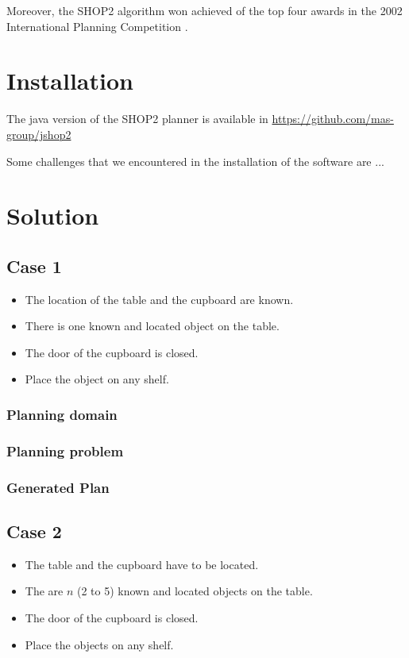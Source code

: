 \documentclass[paper=a4, fontsize=11pt]{scrartcl}
\begin{document}
 	Moreover, the SHOP2 algorithm won achieved of the top four awards in the 2002 International Planning Competition \cite{Nau2003}.
 	
 	\section{Installation}
 	
 	The java version of the SHOP2 planner is available in \url{https://github.com/mas-group/jshop2}
 	
	Some challenges that we encountered in the installation of the software are ...
	
	\section{Solution}
	
	\subsection{Case 1}
	
	\begin{itemize}
		\item The location of the table and the cupboard are known.
		\item There is one known and located object on the table.
		\item The door of the cupboard is closed.
		\item Place the object on any shelf.
	\end{itemize}
	
	\subsubsection*{Planning domain}
	
	\subsubsection*{Planning problem}
	
	\subsubsection*{Generated Plan}
	
	\subsection{Case 2}
	
	\begin{itemize}
		\item The table and the cupboard have to be located.
		\item The are $n$ (2 to 5) known and located objects on the table.
		\item The door of the cupboard is closed.
		\item Place the objects on any shelf.
	\end{itemize}
	
\end{document}
